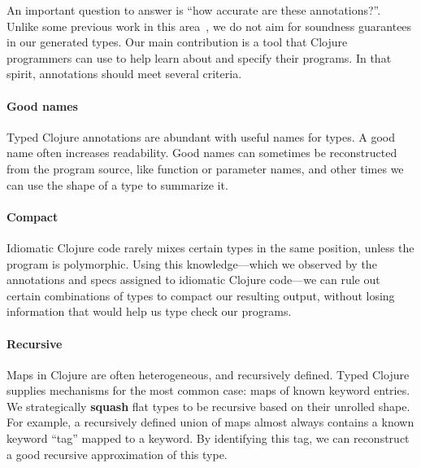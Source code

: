 \documentclass[9pt]{extarticle}
\begin{document}
An important question to answer is ``how accurate are these annotations?''.
Unlike some previous work in this area~\cite{An10dynamicinference}, we do not aim for soundness guarantees
in our generated types.
Our main contribution is a tool that Clojure programmers
can use to help learn about and specify their programs.
In that spirit, annotations should meet several criteria.

\paragraph{Good names}
Typed Clojure %
annotations are abundant
with useful names for types. A good name often increases
readability.
Good names can sometimes be reconstructed from the program source,
like function or parameter names, and other times 
we can use the shape of a type to summarize it.

\paragraph{Compact}
Idiomatic Clojure code rarely mixes certain types in the same position,
unless the program is polymorphic. Using this knowledge---which we observed
by the annotations and specs assigned to idiomatic Clojure 
code---we can rule out certain combinations of types to compact our
resulting output, without losing information that would help us
type check our programs.

\paragraph{Recursive}
Maps in Clojure are often heterogeneous, and recursively defined.
Typed Clojure %
supplies mechanisms for the most
common case: maps of known keyword entries.
We strategically \textbf{squash} flat types to be recursive
based on their unrolled shape.
For example, a recursively defined union of maps almost always
contains a known keyword ``tag'' mapped to a keyword.
By identifying this tag, we can reconstruct a good recursive
approximation of this type.
\end{document}
